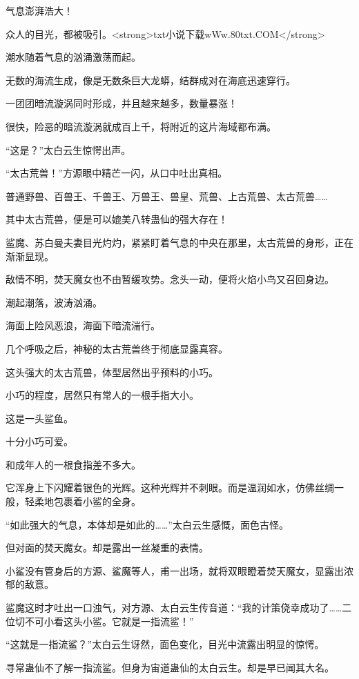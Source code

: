 
\begin{this_body}

气息澎湃浩大！

众人的目光，都被吸引。<strong>txt小说下载wWw.80txt.COM</strong>

潮水随着气息的汹涌激荡而起。

无数的海流生成，像是无数条巨大龙蟒，结群成对在海底迅速穿行。

一团团暗流漩涡同时形成，并且越来越多，数量暴涨！

很快，险恶的暗流漩涡就成百上千，将附近的这片海域都布满。

“这是？”太白云生惊愕出声。

“太古荒兽！”方源眼中精芒一闪，从口中吐出真相。

普通野兽、百兽王、千兽王、万兽王、兽皇、荒兽、上古荒兽、太古荒兽……

其中太古荒兽，便是可以媲美八转蛊仙的强大存在！

鲨魔、苏白曼夫妻目光灼灼，紧紧盯着气息的中央在那里，太古荒兽的身形，正在渐渐显现。

敌情不明，焚天魔女也不由暂缓攻势。念头一动，便将火焰小鸟又召回身边。

潮起潮落，波涛汹涌。

海面上险风恶浪，海面下暗流湍行。

几个呼吸之后，神秘的太古荒兽终于彻底显露真容。

这头强大的太古荒兽，体型居然出乎预料的小巧。

小巧的程度，居然只有常人的一根手指大小。

这是一头鲨鱼。

十分小巧可爱。

和成年人的一根食指差不多大。

它浑身上下闪耀着银色的光辉。这种光辉并不刺眼。而是温润如水，仿佛丝绸一般，轻柔地包裹着小鲨的全身。

“如此强大的气息，本体却是如此的……”太白云生感慨，面色古怪。

但对面的焚天魔女。却是露出一丝凝重的表情。

小鲨没有管身后的方源、鲨魔等人，甫一出场，就将双眼瞪着焚天魔女，显露出浓郁的敌意。

鲨魔这时才吐出一口浊气，对方源、太白云生传音道：“我的计策侥幸成功了……二位切不可小看这头小鲨。它就是一指流鲨！”

“这就是一指流鲨？”太白云生讶然，面色变化，目光中流露出明显的惊愕。

寻常蛊仙不了解一指流鲨。但身为宙道蛊仙的太白云生。却是早已闻其大名。


\end{this_body}
